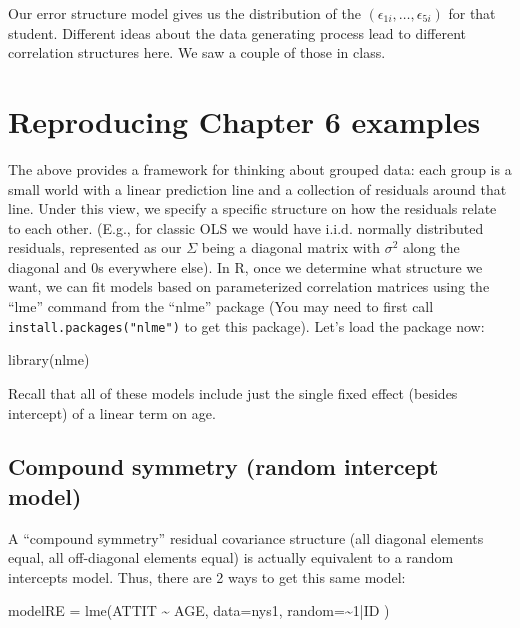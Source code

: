 \documentclass[
  letterpaper,
  DIV=11,
  numbers=noendperiod]{scrreprt}
\newenvironment{Shaded}{\begin{snugshade}}{\end{snugshade}}
\newcommand{\AttributeTok}[1]{\textcolor[rgb]{0.49,0.56,0.16}{#1}}
\newcommand{\DecValTok}[1]{\textcolor[rgb]{0.25,0.63,0.44}{#1}}
\newcommand{\FunctionTok}[1]{\textcolor[rgb]{0.02,0.16,0.49}{#1}}
\newcommand{\NormalTok}[1]{\textcolor[rgb]{0.00,0.44,0.13}{#1}}
\newcommand{\OtherTok}[1]{\textcolor[rgb]{0.00,0.44,0.13}{#1}}
\newcommand{\SpecialCharTok}[1]{\textcolor[rgb]{0.25,0.44,0.63}{#1}}
\begin{document}
Our error structure model gives us the distribution of the
\((\epsilon_{1i}, \ldots, \epsilon_{5i})\) for that student. Different
ideas about the data generating process lead to different correlation
structures here. We saw a couple of those in class.

\hypertarget{reproducing-chapter-6-examples}{%
\section{Reproducing Chapter 6
examples}\label{reproducing-chapter-6-examples}}

The above provides a framework for thinking about grouped data: each
group is a small world with a linear prediction line and a collection of
residuals around that line. Under this view, we specify a specific
structure on how the residuals relate to each other. (E.g., for classic
OLS we would have i.i.d. normally distributed residuals, represented as
our \(\Sigma\) being a diagonal matrix with \(\sigma^2\) along the
diagonal and 0s everywhere else). In R, once we determine what structure
we want, we can fit models based on parameterized correlation matrices
using the ``lme'' command from the ``nlme'' package (You may need to
first call \texttt{install.packages("nlme")} to get this package). Let's
load the package now:

\begin{Shaded}
\begin{Highlighting}[]
\FunctionTok{library}\NormalTok{(nlme)}
\end{Highlighting}
\end{Shaded}

Recall that all of these models include just the single fixed effect
(besides intercept) of a linear term on age.

\hypertarget{compound-symmetry-random-intercept-model}{%
\subsection{Compound symmetry (random intercept
model)}\label{compound-symmetry-random-intercept-model}}

A ``compound symmetry'' residual covariance structure (all diagonal
elements equal, all off-diagonal elements equal) is actually equivalent
to a random intercepts model. Thus, there are 2 ways to get this same
model:

\begin{Shaded}
\begin{Highlighting}[]
\NormalTok{modelRE }\OtherTok{=} \FunctionTok{lme}\NormalTok{(ATTIT }\SpecialCharTok{\textasciitilde{}}\NormalTok{ AGE, }
              \AttributeTok{data=}\NormalTok{nys1,}
              \AttributeTok{random=}\SpecialCharTok{\textasciitilde{}}\DecValTok{1}\SpecialCharTok{|}\NormalTok{ID )}
\end{Highlighting}
\end{Shaded}
\end{document}
